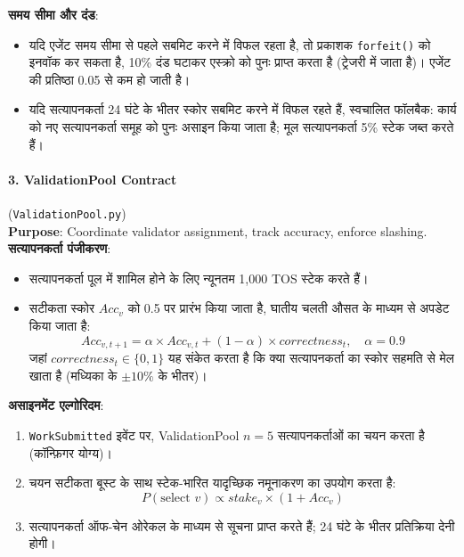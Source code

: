 \documentclass[11pt]{article}
\begin{document}
\textbf{समय सीमा और दंड}:
\begin{itemize}[noitemsep]
  \item यदि एजेंट समय सीमा से पहले सबमिट करने में विफल रहता है, तो प्रकाशक \texttt{forfeit()} को इनवॉक कर सकता है, 10\% दंड घटाकर एस्क्रो को पुनः प्राप्त करता है (ट्रेजरी में जाता है)। एजेंट की प्रतिष्ठा 0.05 से कम हो जाती है।
  \item यदि सत्यापनकर्ता 24 घंटे के भीतर स्कोर सबमिट करने में विफल रहते हैं, स्वचालित फॉलबैक: कार्य को नए सत्यापनकर्ता समूह को पुनः असाइन किया जाता है; मूल सत्यापनकर्ता 5\% स्टेक जब्त करते हैं।
\end{itemize}

\paragraph{3. ValidationPool Contract} (\texttt{ValidationPool.py})\\
\textbf{Purpose}: Coordinate validator assignment, track accuracy, enforce slashing.\\
\textbf{सत्यापनकर्ता पंजीकरण}:
\begin{itemize}[noitemsep]
  \item सत्यापनकर्ता पूल में शामिल होने के लिए न्यूनतम 1,000 TOS स्टेक करते हैं।
  \item सटीकता स्कोर $Acc_v$ को 0.5 पर प्रारंभ किया जाता है, घातीय चलती औसत के माध्यम से अपडेट किया जाता है:
    \begin{equation}
    Acc_{v,t+1} = \alpha \times Acc_{v,t} + (1-\alpha) \times correctness_t, \quad \alpha = 0.9
    \end{equation}
    जहां $correctness_t \in \{0,1\}$ यह संकेत करता है कि क्या सत्यापनकर्ता का स्कोर सहमति से मेल खाता है (मध्यिका के $\pm10\%$ के भीतर)।
\end{itemize}
\textbf{असाइनमेंट एल्गोरिदम}:
\begin{enumerate}[noitemsep]
  \item \texttt{WorkSubmitted} इवेंट पर, ValidationPool $n=5$ सत्यापनकर्ताओं का चयन करता है (कॉन्फ़िगर योग्य)।
  \item चयन सटीकता बूस्ट के साथ स्टेक-भारित यादृच्छिक नमूनाकरण का उपयोग करता है:
    \begin{equation}
    P(\text{select } v) \propto stake_v \times (1 + Acc_v)
    \end{equation}
  \item सत्यापनकर्ता ऑफ-चेन ओरेकल के माध्यम से सूचना प्राप्त करते हैं; 24 घंटे के भीतर प्रतिक्रिया देनी होगी।
\end{enumerate}
\end{document}
